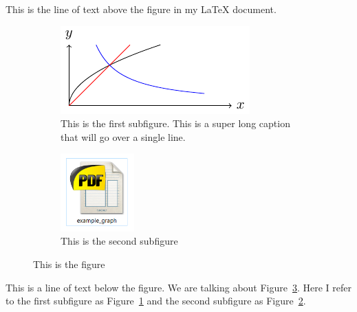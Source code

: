 \documentclass{article}
\begin{document}
This is the line of text above the figure in my \LaTeX{} document.

\begin{figure}[h]
  \centering
    \begin{subfigure}[t]{0.5\textwidth}
      \centering
      \includegraphics[width=\linewidth]{figs/example_graph.pdf}
      \caption{This is the first subfigure. This is a super long caption that will go over a single line.}\label{fig:subfig1}
    \end{subfigure}%
    \begin{subfigure}[t]{0.5\textwidth}
      \centering
      \includegraphics[height=3cm]{figs/Snipping_tool_image.png}
      \caption{This is the second subfigure}\label{fig:subfig2}
    \end{subfigure}
  \caption{This is the figure}\label{fig:example}
\end{figure}


This is a line of text below the figure. We are talking about Figure~\ref{fig:example}. Here I refer to the first subfigure as Figure~\ref{fig:subfig1} and the second subfigure as Figure~\ref{fig:subfig2}.
\end{document}
